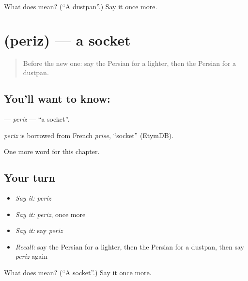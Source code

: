\begin{tcolorbox}[breakable,colback=teal!4,colframe=teal!35!black,title={Before you move on}]
What does   mean? (\textquotedblleft{}A dustpan\textquotedblright{}.) Say it once more.
\end{tcolorbox}
\section[\texorpdfstring{\fa{پریز} (periz)}{پریز (periz)}]{ (periz) — a socket}

\label{lesson:FA-C175-periz}



\begin{quote}
Before the new one: say the Persian for a lighter, then the Persian for a dustpan.
\end{quote}

\subsection*{You'll want to know: }
\textbf{} — \emph{periz} — \textquotedblleft{}a socket\textquotedblright{}.

\begin{cousinweb}
\emph{periz} is borrowed from French \emph{prise}, \textquotedblleft{}socket\textquotedblright{} (EtymDB).
\end{cousinweb}

\begin{grammarlens}[title={What you've built}]
One more word for this chapter.
\end{grammarlens}

\subsection*{Your turn}
\begin{itemize}
\raggedright
  \item \emph{Say it:} \emph{periz}
  \item \emph{Say it:} \emph{periz}, once more
  \item \emph{Say it:} say \emph{periz}
  \item \emph{Recall:} say the Persian for a lighter, then the Persian for a dustpan, then say \emph{periz} again
\end{itemize}

\begin{tcolorbox}[breakable,colback=teal!4,colframe=teal!35!black,title={Before you move on}]
What does  mean? (\textquotedblleft{}A socket\textquotedblright{}.) Say it once more.
\end{tcolorbox}
